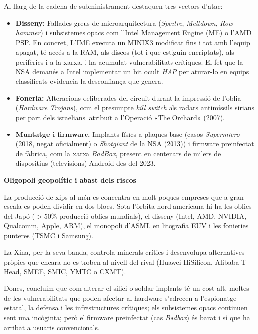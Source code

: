 \documentclass[catalan, a4paper]{article}
\begin{document}
Al llarg de la cadena de subministrament destaquen tres vectors d'atac:
\begin{itemize}
    \item \textbf{Disseny:} Fallades greus de microarquitectura (\textit{Spectre}, \textit{Meltdown},
      \textit{Row hammer}) i subsistemes opacs com l'Intel Management Engine (ME) o l'AMD PSP.
    En concret, L'IME executa un MINIX3 modificat fins i tot amb l'equip apagat, té accés a la RAM,
    als discos (tot i que estiguin encriptats), als perifèrics i a la xarxa, i ha acumulat
    vulnerabilitats crítiques. El fet que la NSA demanés a Intel implementar un bit ocult
    \textit{HAP} per aturar-lo en equips classificats evidencia la desconfiança que genera.

    \item \textbf{Foneria:} Alteracions deliberades del circuit durant la impressió de
      l'oblia (\textit{Hardware Trojans}), com el presumpte \textit{kill switch} als radars
      antimíssils sirians per part dels israelians, atribuït a l'Operació «The Orchard» (2007).

    \item \textbf{Muntatge i firmware:} Implants físics a plaques base (casos \textit{Supermicro}
      (2018, negat oficialment) o \textit{Shotgiant} de la NSA (2013)) i firmware preinfectat de
      fàbrica, com la xarxa \textit{BadBox}, present en centenars de milers de dispositius (televisions) Android des del 2023.
\end{itemize}

\textbf{Oligopoli geopolític i abast dels riscos}

La producció de xips al món es concentra en molt poques empreses que a gran escala es poden
dividir en dos blocs. Sota l'òrbita nord-americana hi ha les oblies del Japó ($>50\%$ producció oblies mundials),
el disseny (Intel, AMD, NVIDIA, Qualcomm, Apple, ARM), el monopoli d'ASML en litografia EUV i les
fonieries punteres (TSMC i Samsung).

La Xina, per la seva banda, controla minerals crítics i desenvolupa alternatives pròpies
que encara no es troben al nivell del rival
(Huawei HiSilicon, Alibaba T-Head, SMEE, SMIC, YMTC o CXMT).

Doncs, concluim que com alterar el silici o soldar implants té un cost alt, moltes de
les vulnerabilitats que poden afectar al hardware s'adrecen a l'espionatge estatal, la defensa
i les infrestructures crítiques; els subsistemes opacs continuen sent una incòginta; però
el firmware preinfectat (cas \textit{Badbox}) és barat i sí que ha arribat a usuaris convencionals.
\end{document}
